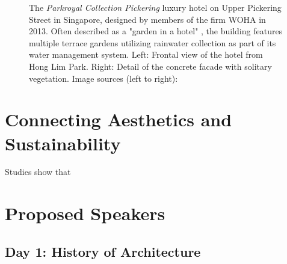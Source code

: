 \documentclass{article}
\begin{document}
\begin{figure}[ht!]
    \centering
    \caption{The \textit{Parkroyal Collection Pickering} luxury hotel on Upper Pickering Street in Singapore, designed by members of the firm WOHA in 2013. Often described as a "garden in a hotel" \cite{hill_take_2021}, the building features multiple terrace gardens utilizing rainwater collection as part of its water management system. Left: Frontal view of the hotel from Hong Lim Park. Right: Detail of the concrete facade with solitary vegetation. \newline Image sources (left to right): \cite{morin_hotel_2018}\cite{smu_constitutional_and_administrative_law_wikipedia_project_parkroyal_2013}}
    \label{fig:parkroyal}
\end{figure}

\clearpage
\section{Connecting Aesthetics and Sustainability}

Studies show that 


\clearpage
\section{Proposed Speakers}
\subsection{Day 1: History of Architecture}
\end{document}
